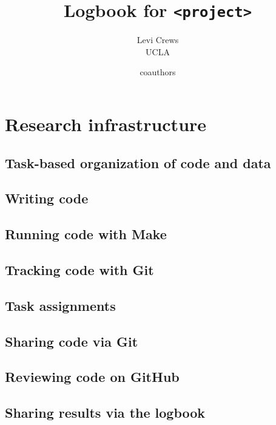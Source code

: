 \documentclass{report}
\title{Logbook for \texttt{<project>}}
\author{
Levi Crews \\ {UCLA} \and
coauthors
}
\date{}
\numberwithin{equation}{section}
\numberwithin{figure}{section}
\numberwithin{table}{section}
\begin{document}
\maketitle

\renewcommand{\thechapter}{\Alph{chapter}}
\setcounter{tocdepth}{1}
\tableofcontents
\etocsettocstyle{}{} %

\chapter{Research infrastructure}


\section{Task-based organization of code and data} 
\section{Writing code} 
\section{Running code with Make} 
\section{Tracking code with Git} 

\section{Task assignments} 
\section{Sharing code via Git} 
\section{Reviewing code on GitHub} 
\section{Sharing results via the logbook} 
\end{document}
